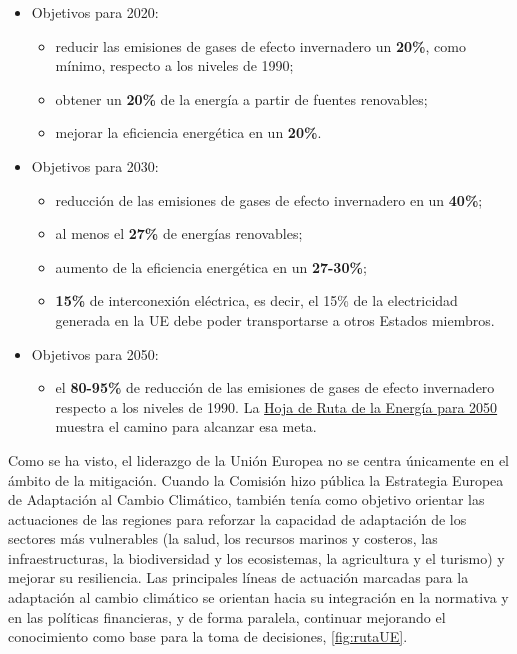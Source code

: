 \begin{itemize}
\item
  Objetivos para 2020:

  \begin{itemize}
  \item
    reducir las emisiones de gases de efecto invernadero un
    \textbf{20\%}, como mínimo, respecto a los niveles de 1990;
  \item
    obtener un \textbf{20\%} de la energía a partir de fuentes
    renovables;
  \item
    mejorar la eficiencia energética en un \textbf{20\%}.
  \end{itemize}
\item
  Objetivos para 2030:

  \begin{itemize}
  \item
    reducción de las emisiones de gases de efecto invernadero en un
    \textbf{40\%};
  \item
    al menos el \textbf{27\%} de energías renovables;
  \item
    aumento de la eficiencia energética en un \textbf{27-30\%};
  \item
    \textbf{15\%} de interconexión eléctrica, es decir, el 15\% de la
    electricidad generada en la UE debe poder transportarse a otros
    Estados miembros.
  \end{itemize}
\item
  Objetivos para 2050:

  \begin{itemize}
  \item
    el \textbf{80-95\%} de reducción de las emisiones de gases de efecto
    invernadero respecto a los niveles de 1990. La
    \href{http://eur-lex.europa.eu/legal-content/ES/ALL/?uri=CELEX:52011DC0885}{Hoja
    de Ruta de la Energía para 2050} muestra el camino para alcanzar esa
    meta.
  \end{itemize}
\end{itemize}

Como se ha visto, el liderazgo de la Unión Europea no se centra
únicamente en el ámbito de la mitigación. Cuando la Comisión hizo
pública la Estrategia Europea de Adaptación al Cambio Climático, también
tenía como objetivo orientar las actuaciones de las regiones para
reforzar la capacidad de adaptación de los sectores más vulnerables (la
salud, los recursos marinos y costeros, las infraestructuras, la
biodiversidad y los ecosistemas, la agricultura y el turismo) y mejorar
su resiliencia. Las principales líneas de actuación marcadas para la
adaptación al cambio climático se orientan hacia su integración en la
normativa y en las políticas financieras, y de forma paralela, continuar
mejorando el conocimiento como base para la toma de decisiones, \autoref{fig:rutaUE}.

